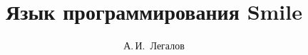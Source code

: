 \documentclass [a4paper, 12pt, oneside]{scrbook}
\begin{document}
\renewcommand\figurename{Рисунок}

\title{\Huge{Язык программирования Smile}}
\author {\Large{А.\,И.~Легалов}}
\maketitle

\tableofcontents




















\end{document}
